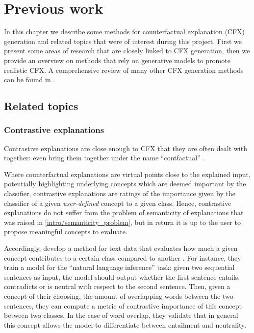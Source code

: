 \documentclass[../main.tex]{subfiles}
\begin{document}
\chapter{Previous work}
\label{ch:previous_work}

In this chapter we describe some methods for counterfactual explanation (CFX) generation and related topics that were of interest during this project.
First we present some areas of research that are closely linked to CFX generation, then we provide an overview on methods that rely on generative models to promote realistic CFX.
A comprehensive review of many other CFX generation methods can be found in \cite{vermaCounterfactual2020}.

\section{Related topics}

\subsection{Contrastive explanations}

Contrastive explanations are close enough to CFX that they are often dealt with together: \citeauthor{stepinSurvey2021} even bring them together under the name ``contfactual'' \cite{stepinSurvey2021}.

Where counterfactual explanations are virtual points close to the explained input, potentially highlighting underlying concepts which are deemed important by the classifier, contrastive explanations are ratings of the importance given by the classifier of a given \emph{user-defined} concept to a given class.
Hence, contrastive explanations do not suffer from the problem of semanticity of explanations that was raised in \autoref{intro/semanticity_problem}, but in return it is up to the user to propose meaningful concepts to evaluate.

Accordingly, \citeauthor{jacoviContrastive2021} develop a method for text data that evaluates how much a given concept contributes to a certain class compared to another \cite{jacoviContrastive2021}.
For instance, they train a model for the ``natural language inference'' task: given two sequential sentences as input, the model should output whether the first sentence entails, contradicts or is neutral with respect to the second sentence.
Then, given a concept of their choosing, \eg{} the amount of overlapping words between the two sentences, they can compute a metric of contrastive importance of this concept between two classes.
In the case of word overlap, they validate that in general this concept allows the model to differentiate between entailment and neutrality.
\end{document}

